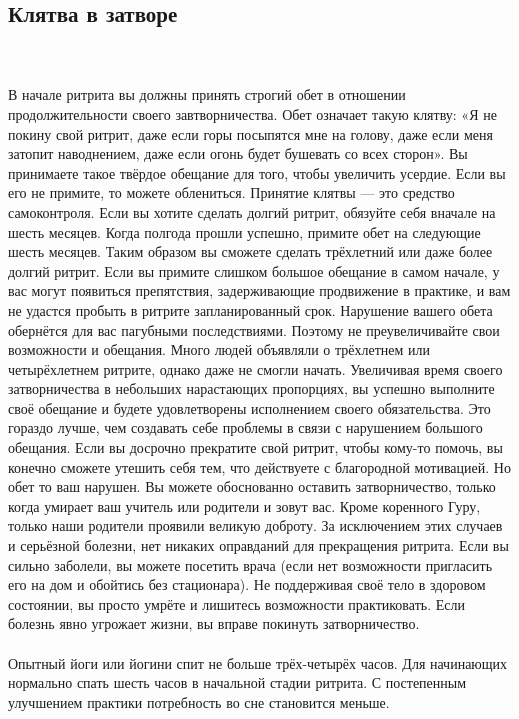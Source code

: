 \subsection{Клятва в затворе}
\\ \\ В начале ритрита вы должны принять строгий обет в отноше\-нии продолжительности
      своего завтворничества. Обет означа\-ет такую клятву: «Я не покину свой ритрит,
      даже если горы посыпятся мне на голову, даже если меня затопит наводнением,
      даже если огонь будет бушевать со всех сторон». Вы принимае\-те такое твёрдое
      обещание для того, чтобы увеличить усердие. Если вы его не примите,
      то можете облениться. Принятие клятвы — это средство самоконтроля.
      Если вы хотите сделать долгий ритрит, обязуйте себя вначале на шесть месяцев.
      Когда полгода прошли успешно, примите обет на следующие шесть месяцев.
      Таким образом вы сможете сделать трёхлетний или даже более долгий ритрит.
      Если вы примите слишком большое обещание в самом начале, у вас могут появиться
      препятствия, задерживающие продвижение в практике, и вам не удастся пробыть
      в ритрите запланированный срок. Нарушение вашего обета обернётся для вас
      пагубными последствиями. Поэтому не преувеличивайте свои возможности и обещания.
      Много людей объявляли о трёхлетнем или четырёхлетнем ритрите, однако даже
      не смогли начать. Увеличивая время своего затворничества в небольших
      нарастающих пропорциях, вы успешно выполните своё обещание и будете
      удовлетворены исполнением своего обязательства. Это гораздо лучше,
      чем создавать себе проблемы в связи с нарушением большого обещания.
      Если вы досрочно прекратите свой ритрит, чтобы кому-то помочь,
      вы конечно сможете утешить себя тем, что действуете с благородной мотивацией.
      Но обет то ваш нарушен. Вы можете обоснованно оставить затворничество,
      только когда умирает ваш учитель или родители и зовут вас.
      Кроме коренного Гуру, только наши родители проявили великую доброту.
      За исключением этих случаев и серьёзной болезни, нет никаких оправданий
      для прекращения ритрита. Если вы сильно заболели, вы можете посетить
      врача (если нет возможности пригласить его на дом и обойтись без стациона\-ра).
      Не поддерживая своё тело в здоровом состоянии, вы просто умрёте и лишитесь возможности практиковать. Если болезнь явно угрожает жизни, вы вправе покинуть затворниче\-ство.
\\ \\ Опытный йоги или йогини спит не больше трёх-четырёх часов. Для начинающих нормально спать шесть часов в начальной стадии ритрита. С постепенным улучшением практики потребность во сне становится меньше.
